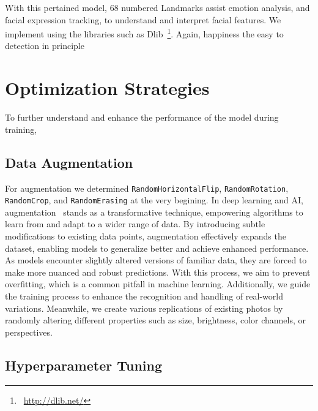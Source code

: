 With this pertained model, 68 numbered Landmarks assist emotion analysis, 
and facial expression tracking, to understand and interpret facial features.
We implement using the libraries such as Dlib~\footnote{~\url{http://dlib.net/}}. %
Again,  happiness the easy to detection in principle 



\section{Optimization Strategies}
\label{sec:optim}

To further understand and enhance the performance of the model during training, 

\subsection{Data Augmentation}
\label{sec:optim:aug}

For augmentation we determined \texttt{RandomHorizontalFlip}, \texttt{RandomRotation}, 
\texttt{RandomCrop}, and \texttt{RandomErasing} at the very begining. 
In deep learning and AI, 
augmentation~\cite{augment} stands as a transformative technique, 
empowering algorithms to learn from and adapt to a wider range of data. 
By introducing subtle modifications to existing data points, 
augmentation effectively expands the dataset, 
enabling models to generalize better and achieve enhanced performance. 
As models encounter slightly altered versions of familiar data, 
they are forced to make more nuanced and robust predictions. 
With this process, we aim to prevent overfitting, which is a common pitfall in machine learning. 
Additionally, we guide the training process to enhance the recognition and handling of real-world variations.
Meanwhile, we create various replications of existing photos by randomly altering different properties such as size, brightness, color channels, or perspectives.

\subsection{Hyperparameter Tuning}
\label{sec:optim:tuning}

